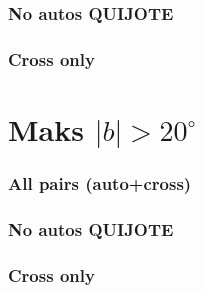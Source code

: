 \clearpage

\subsubsection*{No autos QUIJOTE}



\clearpage

\subsubsection*{Cross only}



\clearpage

\section{Maks $|b| > 20^{\circ}$}

\subsubsection*{All pairs (auto+cross)}



\clearpage

\subsubsection*{No autos QUIJOTE}



\clearpage

\subsubsection*{Cross only}



\clearpage